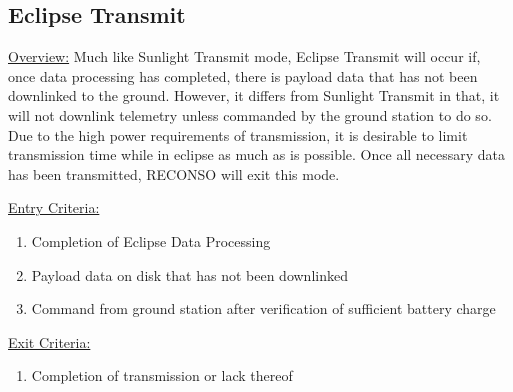 \documentclass{article}
\begin{document}
\newpage

\subsection{Eclipse Transmit}

\underline{Overview:} Much like Sunlight Transmit mode, Eclipse Transmit will occur if, once data processing has completed, there is payload data that has not been downlinked to the ground. However, it differs from Sunlight Transmit in that, it will not downlink telemetry unless commanded by the ground station to do so. Due to the high power requirements of transmission, it is desirable to limit transmission time while in eclipse as much as is possible. Once all necessary data has been transmitted, RECONSO will exit this mode.

\underline{Entry Criteria:} 

\begin{enumerate}
\item Completion of Eclipse Data Processing
\item Payload data on disk that has not been downlinked
\item Command from ground station after verification of sufficient battery charge
\end{enumerate}

\underline{Exit Criteria:}

\begin{enumerate}
\item Completion of transmission or lack thereof
\end{enumerate}
\end{document}
